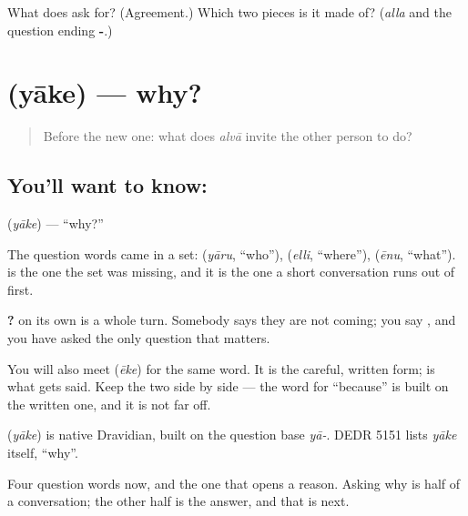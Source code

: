 \begin{tcolorbox}[breakable,colback=teal!4,colframe=teal!35!black,title={Before you move on}]
What does  ask for? (Agreement.) Which two pieces is it made of? (\emph{alla} and the question ending \textbf{-}.)
\end{tcolorbox}
\section[\texorpdfstring{\kn{ಯಾಕೆ} (yāke)}{ಯಾಕೆ (yāke)}]{ (yāke) — why?}

\label{lesson:KA-C69-why}



\begin{quote}
Before the new one: what does \emph{alvā} invite the other person to do?
\end{quote}

\subsection*{You'll want to know: }
\textbf{} (\emph{yāke}) — \textquotedblleft{}why?\textquotedblright{}

The question words came in a set:  (\emph{yāru}, \textquotedblleft{}who\textquotedblright{}),  (\emph{elli}, \textquotedblleft{}where\textquotedblright{}),  (\emph{ēnu}, \textquotedblleft{}what\textquotedblright{}).  is the one the set was missing, and it is the one a short conversation runs out of first.

\textbf{?} on its own is a whole turn. Somebody says they are not coming; you say , and you have asked the only question that matters.

You will also meet \textbf{} (\emph{ēke}) for the same word. It is the careful, written form;  is what gets said. Keep the two side by side — the word for \textquotedblleft{}because\textquotedblright{} is built on the written one, and it is not far off.

\begin{cousinweb}
\textbf{} (\emph{yāke}) is native Dravidian, built on the question base \emph{yā-}. DEDR 5151 lists \emph{yāke} itself, \textquotedblleft{}why\textquotedblright{}.
\end{cousinweb}

\begin{grammarlens}[title={What you've built}]
Four question words now, and the one that opens a reason. Asking why is half of a conversation; the other half is the answer, and that is next.
\end{grammarlens}


